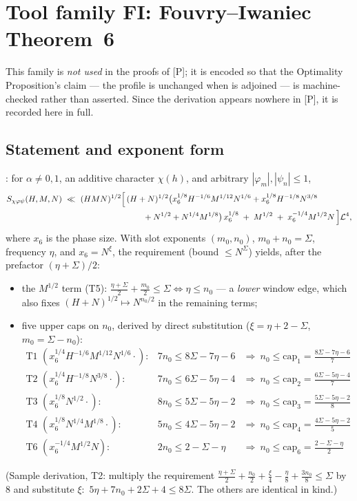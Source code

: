 \documentclass[11pt]{article}
\theoremstyle{remark}
\newcommand{\N}{N}
\begin{document}
\section{Tool family FI: Fouvry--Iwaniec Theorem~6}\label{sec:FI}

This family is \emph{not used} in the proofs of [P]; it is encoded so
that the Optimality Proposition's claim --- the profile is unchanged
when \cite[Theorem~6]{FI} is adjoined --- is machine-checked rather
than asserted. Since the derivation appears nowhere in [P], it is
recorded here in full.

\subsection{Statement and exponent form}
\cite[Theorem~6]{FI}: for $\alpha\ne0,1$, an additive character
$\chi(h)$, and arbitrary $|\varphi_m|,|\psi_n|\le1$,
\begin{align*}
S_{\chi\varphi\psi}(H,M,N)\ \ll\ (HMN)^{1/2}\Bigl[\,&(H+N)^{1/2}
\bigl(x_6^{1/8}H^{-1/6}M^{1/12}N^{1/6}
+x_6^{1/8}H^{-1/8}N^{3/8}\\
&\qquad+N^{1/2}+N^{1/4}M^{1/8}\bigr)\,x_6^{1/8}
\;+\;M^{1/2}\;+\;x_6^{-1/4}M^{1/2}N\,\Bigr]\mathcal{L}^4,
\end{align*}
where $x_6$ is the phase size. With slot exponents $(m_0,n_0)$,
$m_0+n_0=\Sigma$, frequency $\eta$, and $x_6=\N^{\xi}$, the requirement
(bound $\le\N^{\Sigma}$) yields, after the prefactor
$(\eta+\Sigma)/2$:
\begin{itemize}
\item the $M^{1/2}$ term (T5): $\tfrac{\eta+\Sigma}{2}+\tfrac{m_0}{2}
\le\Sigma\iff\eta\le n_0$ --- a \emph{lower} window edge, which also
fixes $(H+N)^{1/2}\mapsto\N^{n_0/2}$ in the remaining terms;
\item five upper caps on $n_0$, derived by direct substitution
($\xi=\eta+2-\Sigma$, $m_0=\Sigma-n_0$):
\[
\begin{array}{lll}
\text{T1 } (x_6^{1/4}H^{-1/6}M^{1/12}N^{1/6}\cdot):
& 7n_0\le 8\Sigma-7\eta-6
& \Rightarrow\ n_0\le\mathrm{cap}_{1}=\tfrac{8\Sigma-7\eta-6}{7}\\[1mm]
\text{T2 } (x_6^{1/4}H^{-1/8}N^{3/8}\cdot):
& 7n_0\le 6\Sigma-5\eta-4
& \Rightarrow\ n_0\le\mathrm{cap}_{2}=\tfrac{6\Sigma-5\eta-4}{7}\\[1mm]
\text{T3 } (x_6^{1/8}N^{1/2}\cdot):
& 8n_0\le 5\Sigma-5\eta-2
& \Rightarrow\ n_0\le\mathrm{cap}_{3}=\tfrac{5\Sigma-5\eta-2}{8}\\[1mm]
\text{T4 } (x_6^{1/8}N^{1/4}M^{1/8}\cdot):
& 5n_0\le 4\Sigma-5\eta-2
& \Rightarrow\ n_0\le\mathrm{cap}_{4}=\tfrac{4\Sigma-5\eta-2}{5}\\[1mm]
\text{T6 } (x_6^{-1/4}M^{1/2}N):
& 2n_0\le 2-\Sigma-\eta
& \Rightarrow\ n_0\le\mathrm{cap}_{6}=\tfrac{2-\Sigma-\eta}{2}
\end{array}
\]
\end{itemize}
(Sample derivation, T2: multiply the requirement
$\tfrac{\eta+\Sigma}{2}+\tfrac{n_0}{2}+\tfrac{\xi}{4}-\tfrac{\eta}{8}
+\tfrac{3n_0}{8}\le\Sigma$ by $8$ and substitute $\xi$:\ 
$5\eta+7n_0+2\Sigma+4\le8\Sigma$. The others are identical in kind.)
\end{document}
